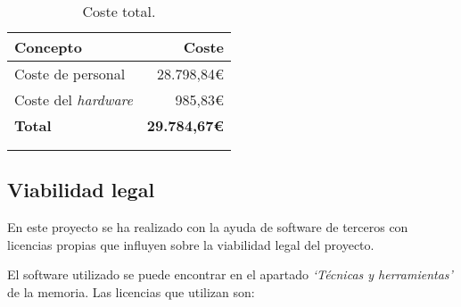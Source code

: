 \begin{longtable}[]{@{}lr@{}}
	\toprule
	\begin{minipage}[b]{0.40\columnwidth}\raggedright\strut
		\textbf{Concepto}\strut
	\end{minipage} & \begin{minipage}[b]{0.20\columnwidth}\raggedright\strut
		\textbf{Coste}\strut
	\end{minipage}\tabularnewline
	\midrule
	\endhead
	\begin{minipage}[t]{0.40\columnwidth}\raggedright\strut
		Coste de personal\strut
	\end{minipage} & \begin{minipage}[t]{0.20\columnwidth}\raggedright\strut
		28.798,84\euro{}\strut
	\end{minipage}\tabularnewline
	\begin{minipage}[t]{0.40\columnwidth}\raggedright\strut
		Coste del \textit{hardware}\strut
	\end{minipage} & \begin{minipage}[t]{0.20\columnwidth}\raggedright\strut
		985,83\euro{}\strut
	\end{minipage}\tabularnewline
	\midrule
	\begin{minipage}[t]{0.40\columnwidth}\raggedright\strut
		\textbf{Total}\strut
	\end{minipage} & \begin{minipage}[t]{0.20\columnwidth}\raggedright\strut
		\textbf{29.784,67\euro{}}\strut
	\end{minipage}\tabularnewline
	\bottomrule
	\\
	\caption{Coste total.}
\end{longtable}

\subsection{Viabilidad legal}

En este proyecto se ha realizado con la ayuda de software de terceros con licencias propias que influyen sobre la viabilidad legal del proyecto.

El software utilizado se puede encontrar en el apartado \textit{`Técnicas y herramientas'} de la memoria. Las licencias que utilizan son:

